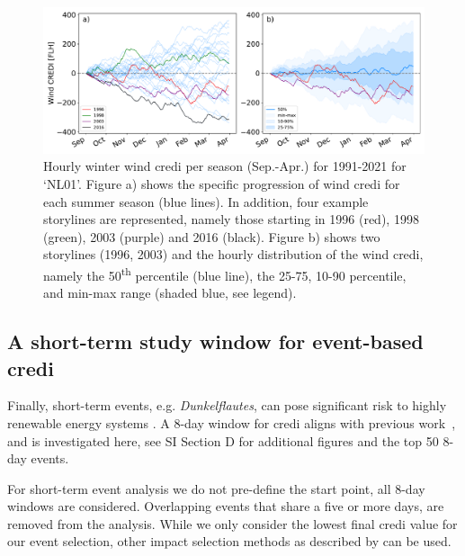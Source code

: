 \documentclass[12pt]{iopart}
\newcommand{\ts}[1]{\textsuperscript{#1}}
\newcommand{\credi}[0]{{\sc credi}}
\newcommand{\wdi}[0]{{\sc wind credi}}
\begin{document}
\begin{figure}[t]
        \centering
        \includegraphics[width=\textwidth]{Figures/WindCREDI_seasonal-winter} 
        \caption{
                Hourly winter \wdi{} per season (Sep.-Apr.) for 1991-2021 for `NL01'. 
                Figure a) shows the specific progression of \wdi{} for each summer season (blue lines). 
                In addition, four example storylines are represented, namely those starting in 1996 (red), 1998 (green), 2003 (purple) and 2016 (black). 
                Figure b) shows two storylines (1996, 2003) and the hourly distribution of the \wdi{}, namely the 50\ts{th} percentile (blue line), the 25-75, 10-90 percentile, and min-max range (shaded blue, see legend).
        }
        \label{fig:analysis_sub-season-winter_wind}
\end{figure}



\subsection{A short-term study window for event-based \credi{}}\label{sc:shortterm}
Finally, short-term events, e.g. \emph{Dunkelflautes}, can pose significant risk to highly renewable energy systems \parencite{tedesco2023,Mockert2022arxiv,vanderwiel2019extreme,Li2022,Sundar2022}. 
A 8-day window for \credi{} aligns with previous work~\parencite{tennet2023}, and is investigated here, see SI Section D for additional figures and the top 50 8-day events. 

For short-term event analysis we do not pre-define the start point, all 8-day windows are considered. 
Overlapping events that share a five or more days, are removed from the analysis. 
While we only consider the lowest final \credi{} value for our event selection, other impact selection methods as described by \textcite{vanderWiel2021} can be used.
\end{document}
